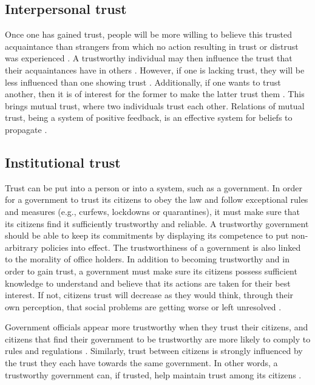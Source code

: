 \pagebreak

\subsection{Interpersonal trust}

Once one has gained trust, people will be more willing to believe this trusted acquaintance than strangers from which no action resulting in trust or distrust was experienced \cite{guha_propagation_2004}. A trustworthy individual may then influence the trust that their acquaintances have in others \cite{gibbs_review_1990}. However, if one is lacking trust, they will be less influenced than one showing trust \cite{cvetkovich_new_2002}.
Additionally, if one wants to trust another, then it is of interest for the former to make the latter trust them \cite{gibbs_review_1990}. This brings mutual trust, where two individuals trust each other. Relations of mutual trust, being a system of positive feedback, is an effective system for beliefs to propagate \cite{guha_propagation_2004}.

\subsection{Institutional trust}

Trust can be put into a person or into a system, such as a government. In order for a government to trust its citizens to obey the law and follow exceptional rules and measures (e.g., curfews, lockdowns or quarantines), it must make sure that its citizens find it sufficiently trustworthy and reliable.
A trustworthy government should be able to keep its commitments by displaying its competence to put non-arbitrary policies into effect. The trustworthiness of a government is also linked to the morality of office holders. In addition to becoming trustworthy and in order to gain trust, a government must make sure its citizens possess sufficient knowledge to understand and believe that its actions are taken for their best interest. If not, citizens trust will decrease as they would think, through their own perception, that social problems are getting worse or left unresolved \cite{levi_political_2000}.

Government officials appear more trustworthy when they trust their citizens, and citizens that find their government to be trustworthy are more likely to comply to rules and regulations \cite{levi_political_2000, devine_trust_2021}. Similarly, trust between citizens is strongly influenced by the trust they each have towards the same government. In other words, a trustworthy government can, if trusted, help maintain trust among its citizens \cite{levi_political_2000}.

